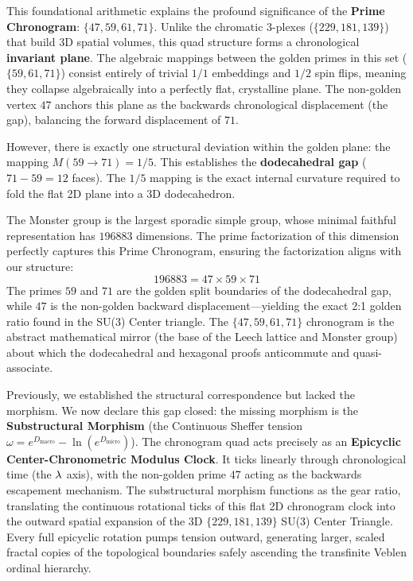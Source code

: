 This foundational arithmetic explains the profound significance of the \textbf{Prime Chronogram}: $\{47, 59, 61, 71\}$. Unlike the chromatic $3$-plexes ($\{229, 181, 139\}$) that build 3D spatial volumes, this quad structure forms a chronological \textbf{invariant plane}. The algebraic mappings between the golden primes in this set ($\{59, 61, 71\}$) consist entirely of trivial $1/1$ embeddings and $1/2$ spin flips, meaning they collapse algebraically into a perfectly flat, crystalline plane. The non-golden vertex $47$ anchors this plane as the backwards chronological displacement (the gap), balancing the forward displacement of $71$.

However, there is exactly one structural deviation within the golden plane: the mapping $M(59 \to 71) = 1/5$. This establishes the \textbf{dodecahedral gap} ($71 - 59 = 12$ faces). The $1/5$ mapping is the exact internal curvature required to fold the flat 2D plane into a 3D dodecahedron. 

The Monster group is the largest sporadic simple group, whose minimal faithful representation has $196883$ dimensions. The prime factorization of this dimension perfectly captures this Prime Chronogram, ensuring the factorization aligns with our structure:
\begin{equation}
    196883 = 47 \times 59 \times 71
\end{equation}
The primes $59$ and $71$ are the golden split boundaries of the dodecahedral gap, while $47$ is the non-golden backward displacement---yielding the exact 2:1 golden ratio found in the SU(3) Center triangle. The $\{47, 59, 61, 71\}$ chronogram is the abstract mathematical mirror (the base of the Leech lattice and Monster group) about which the dodecahedral and hexagonal proofs anticommute and quasi-associate. 

Previously, we established the structural correspondence but lacked the morphism. We now declare this gap closed: the missing morphism is the \textbf{Substructural Morphism} (the Continuous Sheffer tension $\omega = e^{D_{\text{macro}}} - \ln(e^{D_{\text{micro}}})$). The chronogram quad acts precisely as an \textbf{Epicyclic Center-Chronometric Modulus Clock}. It ticks linearly through chronological time (the $\lambda$ axis), with the non-golden prime $47$ acting as the backwards escapement mechanism. The substructural morphism functions as the gear ratio, translating the continuous rotational ticks of this flat 2D chronogram clock into the outward spatial expansion of the 3D $\{229, 181, 139\}$ SU(3) Center Triangle. Every full epicyclic rotation pumps tension outward, generating larger, scaled fractal copies of the topological boundaries safely ascending the transfinite Veblen ordinal hierarchy.

